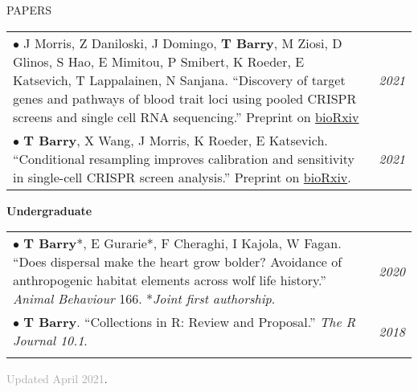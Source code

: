 \documentclass{resume} %
\begin{document}
\begin{rSection}{PAPERS}

\begin{tabular}{p{14cm}R{2.5cm}}
	$\bullet$ J Morris, Z Daniloski, J Domingo, \textbf{T Barry}, M Ziosi, D Glinos, S Hao, E Mimitou, P Smibert, K Roeder, E Katsevich, T Lappalainen, N Sanjana. “Discovery of target genes and pathways of blood trait loci using pooled CRISPR screens and single cell RNA sequencing.” Preprint on \href{https://www.biorxiv.org/content/10.1101/2021.04.07.438882v1}{bioRxiv}  & \textit{2021} \\
	
	$\bullet$ \textbf{T Barry}, X Wang, J Morris, K Roeder, E Katsevich. ``Conditional resampling improves calibration and sensitivity in single-cell CRISPR screen analysis.'' Preprint on \href{https://www.biorxiv.org/content/10.1101/2020.08.13.250092v6}{bioRxiv}.
	 & \textit{2021} \\
\end{tabular} 

\textbf{Undergraduate}

\begin{tabular}{p{14cm}R{2.5cm}}
	$\bullet$ \textbf{T Barry}*, E Gurarie*, F Cheraghi, I Kajola, W Fagan. ``Does dispersal make the heart grow bolder? Avoidance of anthropogenic habitat elements across wolf life history.'' \textit{Animal Behaviour} 166. *\textit{Joint first authorship}. & \textit{2020}  \\
	$\bullet$ \textbf{T Barry}. ``Collections in R: Review and Proposal.'' \textit{The R Journal 10.1}. & \textit{2018} \\ &
\end{tabular} 	
\end{rSection}

\textcolor{darkgray}{Updated April 2021}.
\end{document}
